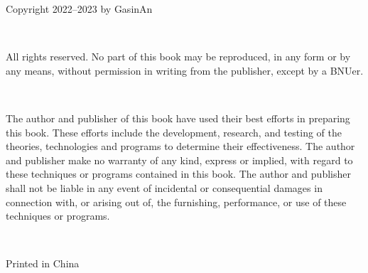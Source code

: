 \noindent Copyright \textcopyright{} 2022--2023 by GasinAn

\ 

\noindent All rights reserved. No part of this book may be reproduced, in any form or by any means, without permission in writing from the publisher, except by a BNUer.

\ 

\noindent The author and publisher of this book have used their best efforts in preparing this book. These efforts include the development, research, and testing of the theories, technologies and programs to determine their effectiveness. The author and publisher make no warranty of any kind, express or implied, with regard to these techniques or programs contained in this book. The author and publisher shall not be liable in any event of incidental or consequential damages in connection with, or arising out of, the furnishing, performance, or use of these techniques or programs.

\ 

\noindent Printed in China
